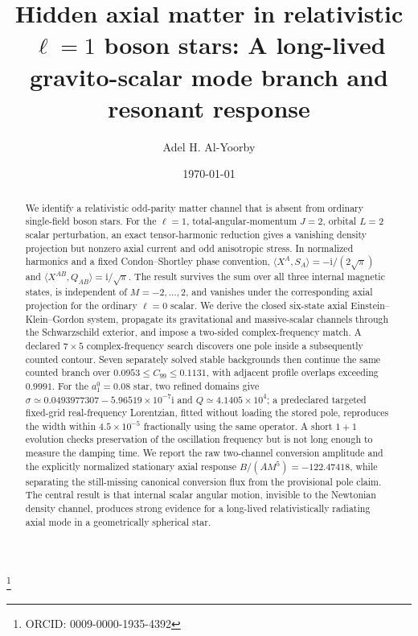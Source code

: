 \documentclass[aps,prd,preprint,onecolumn,nofootinbib,superscriptaddress,showkeys]{revtex4-2}
\newcommand{\ii}{\mathrm{i}}
\begin{document}
\title{Hidden axial matter in relativistic \texorpdfstring{$\ell=1$}{l=1} boson stars: A long-lived gravito-scalar mode branch and resonant response}
\author{Adel H. Al-Yoorby}
\thanks{ORCID: 0009-0000-1935-4392}
\date{\today}

\begin{abstract}
We identify a relativistic odd-parity matter channel that is absent from ordinary single-field boson stars.  For the $\ell=1$, total-angular-momentum $J=2$, orbital $L=2$ scalar perturbation, an exact tensor-harmonic reduction gives a vanishing density projection but nonzero axial current and odd anisotropic stress.  In normalized harmonics and a fixed Condon--Shortley phase convention,
$\langle X^{A},S_{A}\rangle=-\ii/(2\sqrt{\pi})$ and
$\langle X^{AB},Q_{AB}\rangle=\ii/\sqrt{\pi}$.
The result survives the sum over all three internal magnetic states, is independent of $M=-2,\ldots,2$, and vanishes under the corresponding axial projection for the ordinary $\ell=0$ scalar.  We derive the closed six-state axial Einstein--Klein--Gordon system, propagate its gravitational and massive-scalar channels through the Schwarzschild exterior, and impose a two-sided complex-frequency match.  A declared $7\times5$ complex-frequency search discovers one pole inside a subsequently counted contour. Seven separately solved stable backgrounds then continue the same counted branch over $0.0953\leq C_{99}\leq0.1131$, with adjacent profile overlaps exceeding $0.9991$. For the $a_1^0=0.08$ star, two refined domains give
$\sigma\simeq0.0493977307-5.96519\times10^{-7}\ii$ and $Q\simeq4.1405\times10^4$; a predeclared targeted fixed-grid real-frequency Lorentzian, fitted without loading the stored pole, reproduces the width within $4.5\times10^{-5}$ fractionally using the same operator.  A short $1+1$ evolution checks preservation of the oscillation frequency but is not long enough to measure the damping time.  We report the raw two-channel conversion amplitude and the explicitly normalized stationary axial response $B/(AM^5)=-122.47418$, while separating the still-missing canonical conversion flux from the provisional pole claim.  The central result is that internal scalar angular motion, invisible to the Newtonian density channel, produces strong evidence for a long-lived relativistically radiating axial mode in a geometrically spherical star.
\end{abstract}
\end{document}
